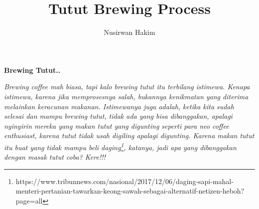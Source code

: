 \documentclass[a4paper]{article}
\begin{document}
\title{Tutut Brewing Process}\author{Nusirwan Hakim}
\maketitle
\begin{center}
\textbf{Brewing Tutut..}

\emph{Brewing coffee mah biasa, tapi kalo brewing tutut itu terbilang istimewa.
Kenapa istimewa, karena jika memprosesnya salah, bukannya kenikmatan yang diterima melainkan keracunan makanan. Istimewanya juga adalah, ketika kita sudah selesai dan mampu brewing tutut, tidak ada yang bisa dibanggakan, apalagi nyinyirin mereka yang makan tutut yang digunting seperti para neo coffee enthusiast, karena tutut tidak usah digiling apalagi digunting. Karena makan tutut itu buat yang tidak mampu beli daging\footnote{https://www.tribunnews.com/nasional/2017/12/06/daging-sapi-mahal-menteri-pertanian-tawarkan-keong-sawah-sebagai-alternatif-netizen-heboh?page=all}, katanya, jadi apa yang dibanggakan dengan masak tutut coba? Kere!!!}\end{center}
\end{document}
